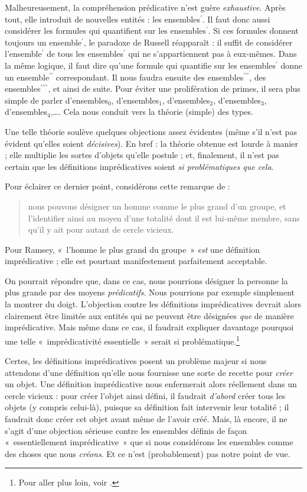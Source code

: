 \documentclass[../../../include/open-logic-section]{subfiles}
\begin{document}
Malheureusement, la compréhension prédicative n'est guère
\emph{exhaustive}. Après tout, elle introduit de nouvelles entités :
les ensembles$^{\prime}$. Il faut donc aussi considérer les formules
qui quantifient sur les ensembles$^{\prime}$. Si ces formules donnent
toujours un ensemble$^{\prime}$, le paradoxe de Russell réapparaît :
il suffit de considérer l'ensemble$^{\prime}$ de tous les
ensembles$^{\prime}$ qui ne s'appartiennent pas à eux-mêmes. Dans la
même logique, il faut dire qu'une formule qui quantifie sur les
ensembles$^{\prime}$ donne un ensemble$^{\prime\prime}$ correspondant.
Il nous faudra ensuite des ensembles$^{\prime\prime\prime}$, des
ensembles$^{\prime\prime\prime\prime}$, et ainsi de suite. Pour éviter
une prolifération de primes, il sera plus simple de parler
d'ensembles$_0$, d'ensembles$_1$, d'ensembles$_2$, d'ensembles$_3$,
d'ensembles$_4$,\ldots. Cela nous conduit vers la théorie (simple)
des types.

Une telle théorie soulève quelques objections assez évidentes (même
s'il n'est pas évident qu'elles soient \emph{décisives}). En bref : la
théorie obtenue est lourde à manier ; elle multiplie les sortes
d'objets qu'elle postule ; et, finalement, il n'est pas certain que
les définitions imprédicatives soient \emph{si problématiques que
cela}.

Pour éclairer ce dernier point, considérons cette remarque de
\citeauthor{Ramsey1925} :
\begin{quote}
	nous pouvons désigner un homme comme le plus grand d'un groupe, et
	l'identifier ainsi au moyen d'une totalité dont il est lui-même
	membre, sans qu'il y ait pour autant de cercle vicieux.
	\citep{Ramsey1925}
\end{quote}
Pour Ramsey, «~l'homme le plus grand du groupe~» \emph{est} une
définition imprédicative ; elle est pourtant manifestement
parfaitement acceptable.

On pourrait répondre que, dans ce cas, nous pourrions désigner la
personne la plus grande par des moyens \emph{prédicatifs}. Nous
pourrions par exemple simplement la montrer du doigt. L'objection
contre les définitions imprédicatives devrait alors clairement être
limitée aux entités qui ne peuvent être désignées \emph{que} de manière
imprédicative. Mais même dans ce cas, il faudrait expliquer davantage
pourquoi une telle «~imprédicativité essentielle~» serait si
problématique.\footnote{Pour aller plus loin, voir \citet{Linnebo2010}.}

Certes, les définitions imprédicatives posent un problème majeur si
nous attendons d'une définition qu'elle nous fournisse une sorte de
recette pour \emph{créer} un objet. Une définition imprédicative nous
enfermerait alors réellement dans un cercle vicieux : pour créer
l'objet ainsi défini, il faudrait \emph{d'abord} créer tous les objets
(y compris celui-là), puisque sa définition fait intervenir leur
totalité ; il faudrait donc créer cet objet avant même de l'avoir
créé. Mais, là encore, il ne s'agit d'une objection sérieuse contre
les ensembles définis de façon «~essentiellement imprédicative~» que
si nous considérons les ensembles comme des choses que nous
\emph{créons}. Et ce n'est (probablement) pas notre point de vue.
\end{document}
